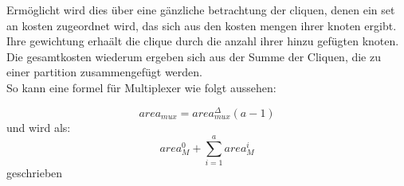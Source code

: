 \documentclass[conference]{IEEEtran}
\begin{document}
Ermöglicht wird dies über eine gänzliche betrachtung der cliquen, denen ein set an kosten zugeordnet wird, das sich aus den kosten mengen ihrer knoten ergibt. Ihre gewichtung erhaält die clique durch die anzahl ihrer hinzu gefügten knoten. Die gesamtkosten wiederum ergeben sich aus der Summe der Cliquen, die zu einer partition zusammengefügt werden.\cite[S. 247]{3}\\
So kann eine formel für Multiplexer wie folgt aussehen:\\
\begin{center}
\begin{equation}
area_{mux} = area_{mux}^{\Delta}(a-1) 
\end{equation}
und wird als:
\begin{equation}
area_{M}^{0} + \sum_{i=1}^{a}area_{M}^{i}
\end{equation}
 geschrieben\\  
 \cite[S. 247]{3}
\end{center}
\end{document}
